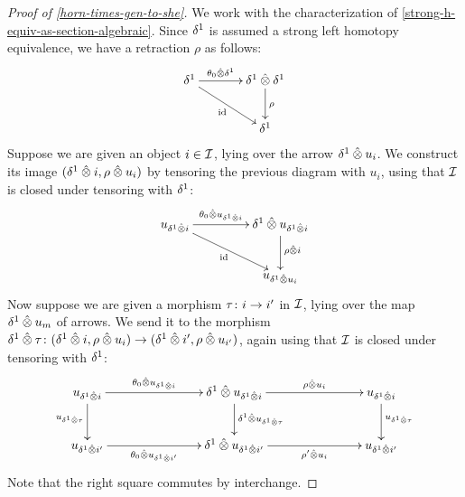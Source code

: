 \documentclass[reqno,10pt,a4paper,oneside]{amsart}
\begin{document}
\begin{proof}[Proof of \cref{horn-times-gen-to-she}]
We work with the characterization of \cref{strong-h-equiv-as-section-algebraic}.
Since $\rcyl$ is assumed a strong left homotopy equivalence, we have a retraction $\rho$ as follows:
\[
\xymatrix@C+1em{
  \rcyl
  \ar[r]^-{\thetal \hatotimes \rcyl}
  \ar[dr]_{\id}
&
  \rcyl \hatotimes \rcyl \ar[d]^{\rho}
\\&
  \rcyl
}
\]
Suppose we are given an object $i \in \cal{I}$, lying over the arrow $\rcyl \hatotimes u_i$.
We construct its image $(\rcyl \hatotimes i, \rho \hatotimes u_i)$ by tensoring the previous diagram with $u_i$, using that $\cal{I}$ is closed under tensoring with $\rcyl$:
\[
\xymatrix@C+2em{
 u_{\rcyl \hatotimes i}
  \ar[r]^-{\thetal \hatotimes u_{\rcyl \hatotimes i}}
  \ar[dr]_{\id}
&
  \rcyl \hatotimes u_{\rcyl \hatotimes i} 
  \ar[d]^{\rho \hatotimes i}
\\&
  u_{\rcyl \hatotimes u_i}
  }
\]
Now suppose we are given a morphism $\tau \co i \to i'$ in $\cal{I}$, lying over the map $\rcyl \hatotimes u_m$ of arrows.
We send it to the morphism $\rcyl \hatotimes \tau \co (\rcyl \hatotimes i, \rho \hatotimes u_i) \to (\rcyl \hatotimes i', \rho \hatotimes u_{i'})$, again using that $\cal{I}$ is closed under tensoring with $\rcyl$:
\[
\xymatrix@C+5em{
  u_{\rcyl \hatotimes i}
  \ar[r]^-{\thetal \hatotimes u_{\rcyl \hatotimes i}}
  \ar[d]_{u_{\rcyl \hatotimes \tau}}
&
  \rcyl \hatotimes u_{\rcyl \hatotimes i}
  \ar[r]^-{\rho \hatotimes u_i}
  \ar[d]^{\rcyl \hatotimes u_{\rcyl \hatotimes \tau}}
&
  u_{\rcyl \hatotimes i}
  \ar[d]^{u_{\rcyl \hatotimes \tau}}
\\
  u_{\rcyl \hatotimes i'}
  \ar[r]_-{\thetal \hatotimes u_{\rcyl \hatotimes i'}}
&
  \rcyl \hatotimes u_{\rcyl \hatotimes i'} 
  \ar[r]_-{\rho' \hatotimes u_i}
&
  u_{\rcyl \hatotimes i'}
}
\]
Note that the right square commutes by interchange.
\end{proof}






\end{document}
